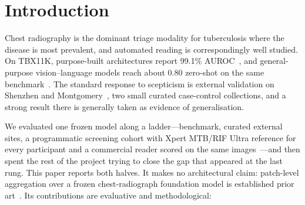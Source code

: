\documentclass[11pt,a4paper]{article}
\begin{document}
\section{Introduction}
Chest radiography is the dominant triage modality for tuberculosis where the disease is most prevalent, and automated reading is correspondingly well studied. On TBX11K, purpose-built architectures report 99.1\% AUROC~\cite{liu2024tbx11k}, and general-purpose vision--language models reach about 0.80 zero-shot on the same benchmark~\cite{akhtar2026audit}. The standard response to scepticism is external validation on Shenzhen and Montgomery~\cite{jaeger2014}, two small curated case-control collections, and a strong result there is generally taken as evidence of generalisation.

We evaluated one frozen model along a ladder---benchmark, curated external sites, a programmatic screening cohort with Xpert MTB/RIF Ultra reference for every participant and a commercial reader scored on the same images~\cite{codlin2025}---and then spent the rest of the project trying to close the gap that appeared at the last rung. This paper reports both halves. It makes no architectural claim: patch-level aggregation over a frozen chest-radiograph foundation model is established prior art~\cite{rege2026radar,yang2025chexfound}. Its contributions are evaluative and methodological:
\end{document}
